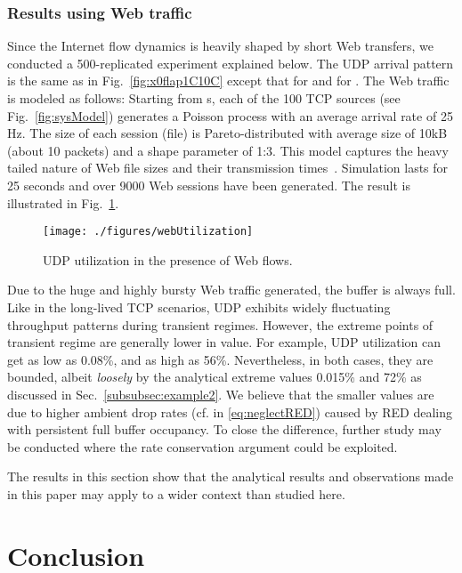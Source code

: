 \documentclass{IEEEtran}
\begin{document}
    \subsubsection{Results using Web traffic}\label{subsub:web}
Since the Internet flow dynamics is heavily shaped by short Web transfers, we conducted a 500-replicated experiment explained below. The UDP arrival pattern is the same as in Fig.~\ref{fig:x0flap1C10C} except that  for  and  for  . The Web traffic is modeled as follows: Starting from s, each of the 100 TCP sources (see Fig.~\ref{fig:sysModel}) generates a Poisson process with an average arrival rate of 25 Hz. The size of each session (file) is Pareto-distributed with average size of 10kB (about 10 packets) and a shape parameter of 1:3. This model captures the heavy tailed nature of Web file sizes and their transmission times~\cite{selfSimilarity97}. Simulation lasts for 25 seconds and over 9000 Web sessions have been generated. The result is illustrated in Fig.~\ref{fig:webUtilization}.

    \begin{figure}[thb!]
            \centering
            \texttt{[image: ./figures/webUtilization]}\caption{UDP utilization in the presence of Web flows.}
            \label{fig:webUtilization}
    \end{figure}



    Due to the huge and highly bursty  Web traffic generated, the buffer  is always full. Like in the long-lived TCP scenarios, UDP exhibits widely fluctuating throughput patterns during transient regimes. However, the extreme points of transient regime are generally lower in  value. For example, UDP utilization can get as low as 0.08\%, and as high as 56\%. Nevertheless, in both cases, they are bounded, albeit \emph{loosely} by the analytical extreme values 0.015\% and 72\% as discussed in Sec.~\ref{subsubsec:example2}. We believe that the smaller values are due to higher ambient drop rates  (cf.  in \eqref{eq:neglectRED}) caused by RED dealing with persistent full buffer occupancy. To close the difference, further study may be conducted where the rate conservation argument could be exploited.


    The results in this section show that the analytical results and observations made in this paper may apply to a wider context than studied here.

     \section{Conclusion}\label{sec:conclusion}
\end{document}
